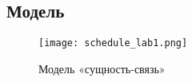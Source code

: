 \documentclass[a4paper, 14pt]{extarticle}
\begin{document}
\subsection{Модель}\label{Sect::task}
\begin{figure}[!htb]
	\centering
	\texttt{[image: schedule\_lab1.png]}
\caption{Модель «сущность-связь»}
\label{fig:system.png}
\end{figure}
\end{document}
